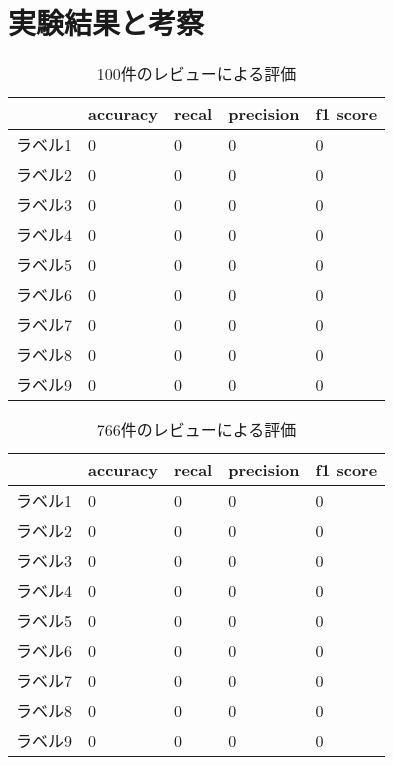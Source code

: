 \documentclass[
  platex, dvipdfmx,  %
]{nlp2024}
\begin{document}
\section{実験結果と考察}
\begin{table}[H]
  \caption{100件のレビューによる評価}
  \label{table2}
  \centering
  \begin{tabular}{|l|l|l|l|l|}
    \hline
    & accuracy & recal & precision & f1 score \\
    \hline
    ラベル1   & 0  & 0       & 0         & 0\\
    \hline
    ラベル2  & 0  & 0       & 0         & 0\\
    \hline
    ラベル3   & 0  & 0       & 0         & 0\\
    \hline
    ラベル4  & 0  & 0       & 0         & 0\\
    \hline
    ラベル5   & 0  & 0       & 0         & 0\\
    \hline
    ラベル6   & 0  & 0       & 0         & 0\\
    \hline
    ラベル7   & 0  & 0       & 0         & 0\\
    \hline
    ラベル8   & 0  & 0       & 0         & 0\\
    \hline
    ラベル9   & 0  & 0       & 0         & 0\\
    \hline
    \end{tabular}
\end{table}

\begin{table}[H]
  \caption{766件のレビューによる評価}
  \label{table3}
  \centering
  \begin{tabular}{|l|l|l|l|l|}
    \hline
    & accuracy & recal & precision & f1 score \\
    \hline
    ラベル1   & 0  & 0       & 0         & 0\\
    \hline
    ラベル2  & 0  & 0       & 0         & 0\\
    \hline
    ラベル3   & 0  & 0       & 0         & 0\\
    \hline
    ラベル4  & 0  & 0       & 0         & 0\\
    \hline
    ラベル5   & 0  & 0       & 0         & 0\\
    \hline
    ラベル6   & 0  & 0       & 0         & 0\\
    \hline
    ラベル7   & 0  & 0       & 0         & 0\\
    \hline
    ラベル8   & 0  & 0       & 0         & 0\\
    \hline
    ラベル9   & 0  & 0       & 0         & 0\\
    \hline
    \end{tabular}
\end{table}
\end{document}
